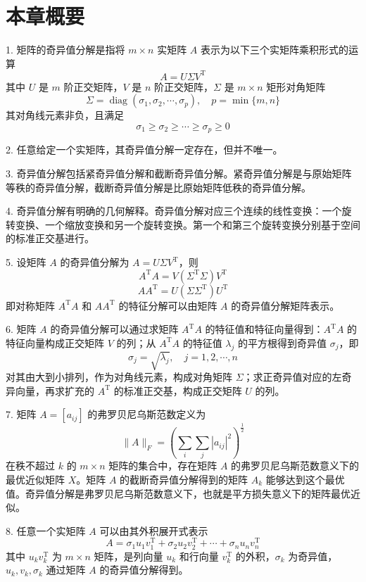\documentclass[UTF8,12pt,a4paper,fontset=fandol]{ctexart}
\begin{document}
\section*{本章概要}

1. 矩阵的奇异值分解是指将 $m\times n$ 实矩阵 $A$ 表示为以下三个实矩阵乘积形式的运算
\[
A=U\Sigma V^{\mathrm{T}}
\]
其中 $U$ 是 $m$ 阶正交矩阵，$V$ 是 $n$ 阶正交矩阵，$\Sigma$ 是 $m\times n$ 矩形对角矩阵
\[
\Sigma=\operatorname{diag}(\sigma_1,\sigma_2,\cdots,\sigma_p),\quad p=\min\{m,n\}
\]
其对角线元素非负，且满足
\[
\sigma_1\geqslant\sigma_2\geqslant\cdots\geqslant\sigma_p\geqslant0
\]

2. 任意给定一个实矩阵，其奇异值分解一定存在，但并不唯一。

3. 奇异值分解包括紧奇异值分解和截断奇异值分解。紧奇异值分解是与原始矩阵等秩的奇异值分解，截断奇异值分解是比原始矩阵低秩的奇异值分解。

4. 奇异值分解有明确的几何解释。奇异值分解对应三个连续的线性变换：一个旋转变换、一个缩放变换和另一个旋转变换。第一个和第三个旋转变换分别基于空间的标准正交基进行。

5. 设矩阵 $A$ 的奇异值分解为 $A=U\Sigma V^{\mathrm{T}}$，则
\[
A^{\mathrm{T}}A=V(\Sigma^{\mathrm{T}}\Sigma)V^{\mathrm{T}}
\]
\[
AA^{\mathrm{T}}=U(\Sigma\Sigma^{\mathrm{T}})U^{\mathrm{T}}
\]
即对称矩阵 $A^{\mathrm{T}}A$ 和 $AA^{\mathrm{T}}$ 的特征分解可以由矩阵 $A$ 的奇异值分解矩阵表示。

6. 矩阵 $A$ 的奇异值分解可以通过求矩阵 $A^{\mathrm{T}}A$ 的特征值和特征向量得到：$A^{\mathrm{T}}A$ 的特征向量构成正交矩阵 $V$ 的列；从 $A^{\mathrm{T}}A$ 的特征值 $\lambda_j$ 的平方根得到奇异值 $\sigma_j$，即
\[
\sigma_j=\sqrt{\lambda_j},\quad j=1,2,\cdots,n
\]
对其由大到小排列，作为对角线元素，构成对角矩阵 $\Sigma$；求正奇异值对应的左奇异向量，再求扩充的 $A^{\mathrm{T}}$ 的标准正交基，构成正交矩阵 $U$ 的列。

7. 矩阵 $A=[a_{ij}]$ 的弗罗贝尼乌斯范数定义为
\[
\|A\|_F=\left(\sum_i\sum_j |a_{ij}|^2\right)^{\frac12}
\]
在秩不超过 $k$ 的 $m\times n$ 矩阵的集合中，存在矩阵 $A$ 的弗罗贝尼乌斯范数意义下的最优近似矩阵 $X$。矩阵 $A$ 的截断奇异值分解得到的矩阵 $A_k$ 能够达到这个最优值。奇异值分解是弗罗贝尼乌斯范数意义下，也就是平方损失意义下的矩阵最优近似。

8. 任意一个实矩阵 $A$ 可以由其外积展开式表示
\[
A=\sigma_1u_1v_1^{\mathrm{T}}+\sigma_2u_2v_2^{\mathrm{T}}+\cdots+\sigma_nu_nv_n^{\mathrm{T}}
\]
其中 $u_kv_k^{\mathrm{T}}$ 为 $m\times n$ 矩阵，是列向量 $u_k$ 和行向量 $v_k^{\mathrm{T}}$ 的外积，$\sigma_k$ 为奇异值，$u_k,v_k,\sigma_k$ 通过矩阵 $A$ 的奇异值分解得到。
\end{document}
